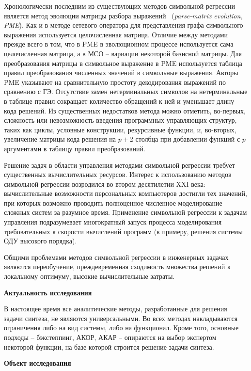 Хронологически последним из существующих методов символьной регрессии является метод эволюции матрицы разбора выражений~\cite{Luo2012} (\textit{parse-matrix evolution, PME}).
Как и в методе сетевого оператора для представления графа символьного выражения используется целочисленная матрица.
Отличие между методами прежде всего в том, что в PME в эволюционном процессе используется сама целочисленная матрица, а в МСО -- вариации некоторой базисной матрицы.
Для преобразования матрицы в символьное выражение в PME используется таблица правил преобразования численных значений в символьные выражения.
Авторы PME указывают на сравнительную простоту декодирования выражений по сравнению с ГЭ.
Отсутствие замен нетерминальных символов на нетерминальные в таблице правил сокращает количество обращений к ней и уменьшает длину кода решений.
Из существенных недостатков метода можно отметить, во-первых, сложность или невозможность введения программных управляющих структур, таких как циклы, условные конструкции, рекурсивные функции, и, во-вторых, увеличение матрицы кода решения на $p+2$ столбца при добавлении функций с $p$ аргументами в таблицу правил преобразований.

Решение задач в области управления методами символьной регрессии требует существенных вычислительных ресурсов.
Интерес к использованию методов символьной регрессии возродился во втором десятилетии XXI века: вычислительные возможности персональных компьютеров достигли тех значений, при которых возможно проводить полноценное численное моделирование сложных систем за разумное время.
Применение символьной регрессии к задачам управления подразумевает многократный запуск процесса моделирования требовательных к скорости вычислений программ (к примеру, решения системы ОДУ высокого порядка).

Общими проблемами методов символьной регрессии в инженерных задачах являются переобучение, преждевременная сходимость множества решений к локальному оптимуму, высокие вычислительные затраты.

\textbf{Актуальность исследования}

В настоящее время все аналитические методы, разработанные для решения задачи синтеза, не являются универсальными. Во всех методах накладываются ограничения либо на вид системы, либо на функционал. Кроме того, основные подходы -- бэкстеппинг, АКОР, АКАР -- опираются на выбор экспертом некоторой функции, на базе которой строится решение задачи синтеза.

\textbf{Объект исследования}

